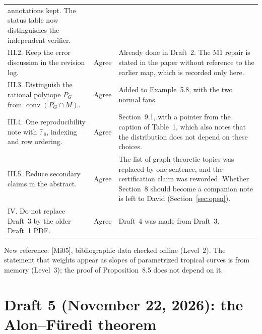 \documentclass[12pt,letterpaper]{article}
\newcommand{\F}{\mathbb{F}}
\begin{document}
\begin{longtable}{@{}L{0.22\textwidth}L{0.12\textwidth}L{0.58\textwidth}@{}}
annotations kept. The status table now distinguishes the independent
verifier.\\
III.2. Keep the error discussion in the revision log. & Agree & Already done
in Draft~2. The M1 repair is stated in the paper without reference to the
earlier map, which is recorded only here.\\
III.3. Distinguish the rational polytope $P_G$ from
$\operatorname{conv}(P_G\cap M)$. & Agree & Added to Example~5.8, with the two
normal fans.\\
III.4. One reproducibility note with $\F_8$, indexing and row ordering. &
Agree & Section~9.1, with a pointer from the caption of Table~1, which also
notes that the distribution does not depend on these choices.\\
III.5. Reduce secondary claims in the abstract. & Agree & The list of
graph-theoretic topics was replaced by one sentence, and the certification
claim was reworded. Whether Section~8 should become a companion note is left
to David (Section~\ref{sec:open}).\\
IV. Do not replace Draft~3 by the older Draft~1 PDF. & Agree & Draft~4 was
made from Draft~3.\\
\bottomrule
\end{longtable}

New reference: [Mi05], bibliographic data checked online (Level~2). The
statement that weights appear as slopes of parametrized tropical curves is
from memory (Level~3); the proof of Proposition~8.5 does not depend on it.

\section{Draft 5 (November 22, 2026): the Alon--F\"uredi theorem}\label{sec:draft5}
\end{document}
